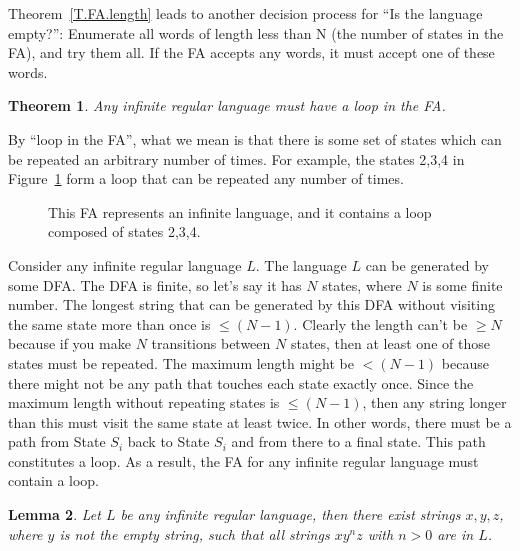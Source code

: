 \documentclass[letterpaper,12pt,openany,reqno]{book}%
\newcommand{\fanonterminalnode}[2] {\node at (#1) (#2) [circle, draw, minimum size=24pt] {#2};}
\newcommand{\fatransition}[3] {\draw [->] (#1) -- (#2) node [midway, above] {#3};}
\newcommand{\faarctransition}[5] {\draw [->] (#1) to[out=#4, in=#5] node  [midway, above] {#3} (#2) ;}
\newtheorem{theorem}{Theorem}
\newtheorem{lemma}[theorem]{Lemma}
\begin{document}
Theorem~\ref{T.FA.length} leads to another decision process for ``Is the language empty?'': Enumerate all words of length less than N (the number of states in the FA), and try them all. If the FA accepts any words, it must accept one of these words.

\begin{theorem}
Any infinite regular language must have a loop in the FA.
\end{theorem}
By ``loop in the FA'', what we mean is that there is some set of states which can be repeated an arbitrary number of times. For example, the states 2,3,4 in Figure~\ref{F.FA.loop} form a loop that can be repeated any number of times. 
\begin{figure}[hbt]
\centering
{}
\caption[FA with a loop]{This FA represents an infinite language, and it contains a loop composed of states 2,3,4.}
\label{F.FA.loop}
\end{figure}
Consider any infinite regular language $L$. The language $L$ can be generated by some DFA. The DFA is finite, so let's say it has $N$ states, where $N$ is some finite number. The longest string that can be generated by this DFA without visiting the same state more than once is $\le (N-1)$. Clearly the length can't be $\ge N$ because if you make $N$ transitions between $N$ states, then at least one of those states must be repeated. The maximum length might be $< (N-1)$ because there might not be any path that touches each state exactly once. Since the maximum length without repeating states is $\le (N-1)$, then any string longer than this must visit the same state at least twice. In other words, there must be a path from State $S_i$ back to State $S_i$ and from there to a final state. This path constitutes a loop. As a result, the FA for any infinite regular language must contain a loop.

\begin{lemma}
\label{T.RL.pumping.lemma}
Let $L$ be any infinite regular language, then there exist strings $x,y,z$, where $y$ is not the empty string, such that all strings $x y^n z$ with $n>0$ are in $L$.
\end{lemma}
\end{document}
